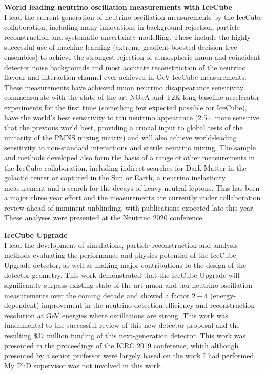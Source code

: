 \documentclass[a4paper,11pt]{article}
\begin{document}
{\bf World leading neutrino oscillation measurements with IceCube} \\ 
I lead the current generation of neutrino oscillation measurements by the IceCube collaboration, including many innovations in background rejection, particle reconstruction and systematic uncertainty modelling. These include the highly successful use of machine learning (extreme gradient boosted decision tree ensembles) to achieve the strongest rejection of atmospheric muon and coincident detector noise backgrounds and most accurate reconstruction of the neutrino flavour and interaction channel ever achieved in GeV IceCube measurements. These measurements have achieved muon neutrino disappearance sensitivity commensurate with the state-of-the-art NO$v$A and T2K long baseline accelerator experiments for the first time (something few expected possible for IceCube), have the world's best sensitivity to tau neutrino appearance (2.5$\times$ more sensitive that the previous world best, providing a crucial input to global tests of the unitarity of the PMNS mixing matrix) and will also achieve world-leading sensitivity to non-standard interactions and sterile neutrino mixing. The sample and methods developed also form the basis of a range of other measurements in the IceCube collaboration, including indirect searches for Dark Matter in the galactic center or captured in the Sun or Earth, a neutrino inelasticity measurement and a search for the decays of heavy neutral leptons. This has been a major three year effort and the measurements are currently under collaboration review ahead of imminent unblinding, with publications expected late this year. These analyses were presented at the Neutrino 2020 conference.

\vspace{0.2cm}

{\bf IceCube Upgrade} \\ 
I lead the development of simulations, particle reconstruction and analysis methods evaluating the performance and physics potential of the IceCube Upgrade detector, as well as making major contributions to the design of the detector geometry. This work demonstrated that the IceCube Upgrade will significantly surpass existing state-of-the-art muon and tau neutrino oscillation measurements over the coming decade and showed a factor $2-4$ (energy-dependent) improvement in the neutrino detection efficiency and reconstruction resolution at GeV energies where oscillations are strong. This work was fundamental to the successful review of this new detector proposal and the resulting \$37 million funding of this next-generation detector. This work was presented in the proceedings of the ICRC 2019 conference, which although presented by a senior professor were largely based on the work I had performed. My PhD supervisor was not involved in this work.
\end{document}
